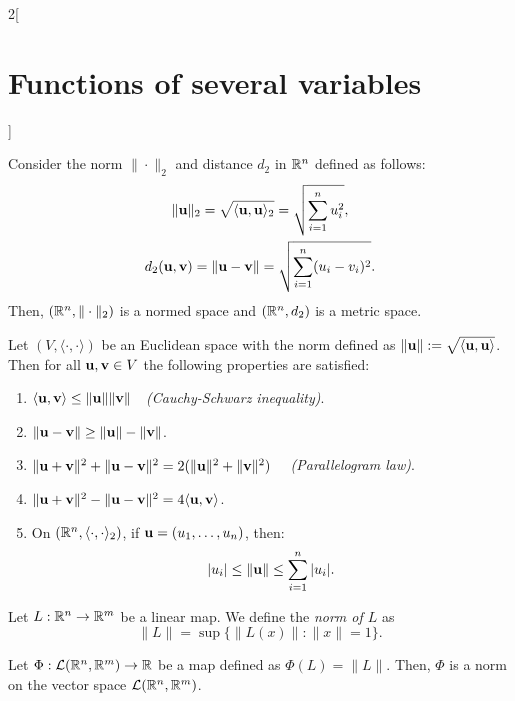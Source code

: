 \documentclass[../../../main.tex]{subfiles}
\begin{document}
\begin{multicols}{2}[\section{Functions of several variables}]
\begin{corollary}
        Consider the norm $\|\cdot\|_2$ and distance $d_2$ in $\mathbb{R}^n$ defined as follows:
        \begin{gather*}
            \|\vb{u}\|_2=\sqrt{\langle \vb{u},\vb{u}\rangle_2}=\sqrt{\sum_{i=1}^nu_i^2},\\
            d_2(\vb{u},\vb{v})=\|\vb{u}-\vb{v}\|=\sqrt{\sum_{i=1}^n(u_i-v_i)^2}.
        \end{gather*}
        Then, $(\mathbb{R}^n,\|\cdot\|_2)$ is a normed space and $(\mathbb{R}^n,d_2)$ is a metric space.
    \end{corollary}
    \begin{prop}
        Let $(V,\langle\cdot,\cdot\rangle)$ be an Euclidean space with the norm defined as $\|\vb{u}\|:=\sqrt{\langle \vb{u},\vb{u}\rangle}$. Then for all $\vb{u},\vb{v}\in V$ the following properties are satisfied:
        \begin{enumerate}
            \item $\langle \vb{u},\vb{v}\rangle\leq\|\vb{u}\|\|\vb{v}\|\quad$\textit{(Cauchy-Schwarz inequality)}.
            \item $\|\vb{u}-\vb{v}\|\geq\|\vb{u}\|-\|\vb{v}\|$.
            \item $\|\vb{u}+\vb{v}\|^2+\|\vb{u}-\vb{v}\|^2=2(\|\vb{u}\|^2+\|\vb{v}\|^2)\quad$ \textit{(Parallelogram law)}.
            \item $\|\vb{u}+\vb{v}\|^2-\|\vb{u}-\vb{v}\|^2=4\langle \vb{u},\vb{v}\rangle$.
            \item On $(\mathbb{R}^n,\langle\cdot,\cdot\rangle_2)$, if $\vb{u}=(u_1,\ldots,u_n)$, then: $$|u_i|\leq\|\vb{u}\|\leq\sum_{i=1}^n|u_i|.$$
        \end{enumerate}
    \end{prop}
    \begin{definition}
        Let $L:\mathbb{R}^n\rightarrow\mathbb{R}^m$ be a linear map. We define the \textit{norm of $L$} as $$\|L\|=\sup\{\|L(x)\|:\|x\|=1\}.$$
    \end{definition}
    \begin{lemma}
        Let $\Phi:\mathcal{L}(\mathbb{R}^n,\mathbb{R}^m)\rightarrow\mathbb{R} $ be a map defined as $\Phi(L)=\|L\|$. Then, $\Phi$ is a norm on the vector space $\mathcal{L}(\mathbb{R}^n,\mathbb{R}^m)$.
    \end{lemma}
    \begin{prop}

\end{prop}
\end{multicols}
\end{document}
